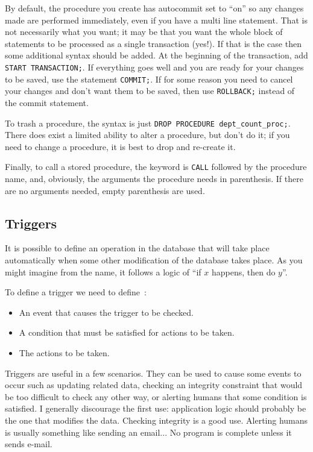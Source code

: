By default, the procedure you create has autocommit set to ``on'' so any changes made are performed immediately, even if you have a multi line statement. That is not necessarily what you want; it may be that you want the whole block of statements to be processed as a single transaction (yes!). If that is the case then some additional syntax should be added. At the beginning of the transaction, add \texttt{START TRANSACTION;}. If everything goes well and you are ready for your changes to be saved, use the statement \texttt{COMMIT;}. If for some reason you need to cancel your changes and don't want them to be saved, then use \texttt{ROLLBACK;} instead of the commit statement.

To trash a procedure, the syntax is just \texttt{DROP PROCEDURE dept\_count\_proc;}. There does exist a limited ability to alter a procedure, but don't do it; if you need to change a procedure, it is best to drop and re-create it.

Finally, to call a stored procedure, the keyword is \texttt{CALL} followed by the procedure name, and, obviously, the arguments the procedure needs in parenthesis. If there are no arguments needed, empty parenthesis are used.

\subsection*{Triggers}

It is possible to define an operation in the database that will take place automatically when some other modification of the database takes place. As you might imagine from the name, it follows a logic of ``if $x$ happens, then do $y$''. 

To define a trigger we need to define~\cite{dsc}:
\begin{itemize}
	\item An event that causes the trigger to be checked.
	\item A condition that must be satisfied for actions to be taken.
	\item The actions to be taken.
\end{itemize}

Triggers are useful in a few scenarios. They can be used to cause some events to occur such as updating related data, checking an integrity constraint that would be too difficult to check any other way, or alerting humans that some condition is satisfied. I generally discourage the first use: application logic should probably be the one that modifies the data. Checking integrity is a good use. Alerting humans is usually something like sending an email... No program is complete unless it sends e-mail.


